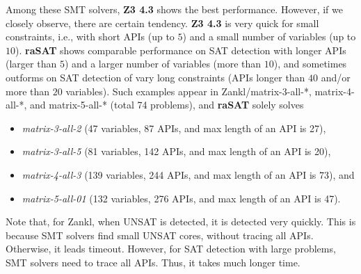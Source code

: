 \documentclass[runningheads,a4paper,oribibl]{llncs}
\begin{document}
Among these SMT solvers, {\bf Z3 4.3} shows the best performance. 
However, if we closely observe, there are certain tendency. 
{\bf Z3 4.3} is very quick for small constraints, i.e., with 
short APIs (up to $5$) and a small number of variables (up to $10$). 
{\bf raSAT} shows comparable performance on SAT detection with 
longer APIs (larger than $5$) and a larger number of variables (more than $10$), 
and sometimes outforms on SAT detection of vary long constraints 
(APIs longer than $40$ and/or more than $20$ variables). 
Such examples appear in Zankl/matrix-3-all-*, matrix-4-all-*, and matrix-5-all-* 
(total 74 problems), and {\bf raSAT} solely solves 
\begin{itemize}
\item {\em matrix-3-all-2} (47 variables, 87 APIs, and max length of an API is 27), 
\item {\em matrix-3-all-5} (81 variables, 142 APIs, and max length of an API is 20), 
\item {\em matrix-4-all-3} (139 variables, 244 APIs, and max length of an API is 73), and 
\item {\em matrix-5-all-01} (132 variables, 276 APIs, and max length of an API is 47). 
\end{itemize}
Note that, for Zankl, when UNSAT is detected, it is detected very quickly. 
This is because SMT solvers find small UNSAT cores, without tracing all APIs.
Otherwise, it leads timeout. 
However, for SAT detection with large problems, 
SMT solvers need to trace all APIs. Thus, it takes much longer time. 
\end{document}
